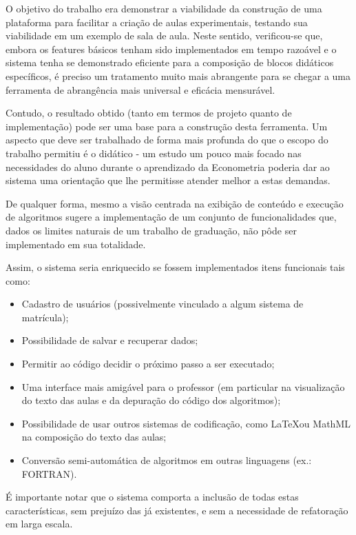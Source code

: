 \documentclass{abnt}
\begin{document}

O objetivo do trabalho era demonstrar a viabilidade da construção de uma plataforma para facilitar a criação de aulas experimentais, testando sua viabilidade em um exemplo de sala de aula. Neste sentido, verificou-se que, embora os features básicos tenham sido implementados em tempo razoável e o sistema tenha se demonstrado eficiente para a composição de blocos didáticos específicos, é preciso um tratamento muito mais abrangente para se chegar a uma ferramenta de abrangência mais universal e eficácia mensurável.

Contudo, o resultado obtido (tanto em termos de projeto quanto de implementação) pode ser uma base para a construção desta ferramenta. Um aspecto que deve ser trabalhado de forma mais profunda do que o escopo do trabalho permitiu é o didático - um estudo um pouco mais focado nas necessidades do aluno durante o aprendizado da Econometria poderia dar ao sistema uma orientação que lhe permitisse atender melhor a estas demandas.

De qualquer forma, mesmo a visão centrada na exibição de conteúdo e execução de algoritmos sugere a implementação de um conjunto de funcionalidades que, dados os limites naturais de um trabalho de graduação, não pôde ser implementado em sua totalidade.

Assim, o sistema seria enriquecido se fossem implementados itens funcionais tais como:

\begin{itemize}
\item Cadastro de usuários (possivelmente vinculado a algum sistema de matrícula);
\item Possibilidade de salvar e recuperar dados;
\item Permitir ao código decidir o próximo passo a ser executado;
\item Uma interface mais amigável para o professor (em particular na visualização do texto das aulas e da depuração do código dos algoritmos);
\item Possibilidade de usar outros sistemas de codificação, como \LaTeX ou MathML na composição do texto das aulas;
\item Conversão semi-automática de algoritmos em outras linguagens (ex.: FORTRAN).
\end{itemize}

É importante notar que o sistema comporta a inclusão de todas estas características, sem prejuízo das já existentes, e sem a necessidade de refatoração em larga escala.
\end{document}
